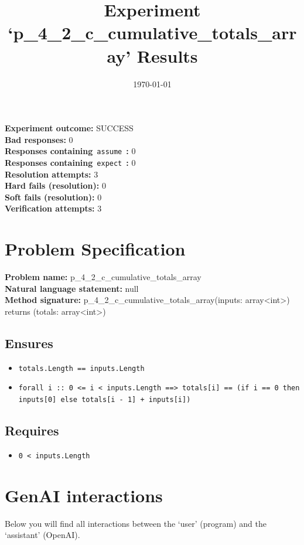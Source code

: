 \documentclass{article}
\begin{document}
\title{Experiment `p\_4\_2\_c\_cumulative\_totals\_array' Results}
\author{\today}
\date{}
\maketitle
\textbf{Experiment outcome: }SUCCESS
\\\textbf{Bad responses: }0
\\\textbf{Responses containing}~\texttt{assume}~\textbf{: }0
\\\textbf{Responses containing}~\texttt{expect}~\textbf{: }0
\\\textbf{Resolution attempts: }3
\\\textbf{Hard fails (resolution): }0
\\\textbf{Soft fails (resolution): }0
\\\textbf{Verification attempts: }3
\section*{Problem Specification}
\textbf{Problem name: }p\_4\_2\_c\_cumulative\_totals\_array
\\\textbf{Natural language statement: }null
\\\textbf{Method signature: }p\_4\_2\_c\_cumulative\_totals\_array(inputs: array<int>) returns (totals: array<int>)
\subsection*{Ensures}
\begin{itemize}
\item \texttt{totals.Length == inputs.Length}
\item \texttt{forall i :: 0 <= i < inputs.Length ==> totals[i] == (if i == 0 then inputs[0] else totals[i - 1] + inputs[i])}
\end{itemize}
\subsection*{Requires}
\begin{itemize}
\item \texttt{0 < inputs.Length}
\end{itemize}
\clearpage
\section*{GenAI interactions}
Below you will find all interactions between the `user' (program) and the `assistant' (OpenAI).
\end{document}

